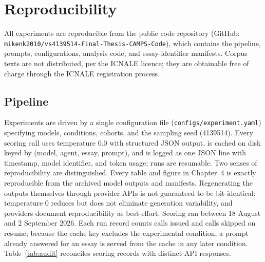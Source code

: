 \chapter{Reproducibility}
\label{chap:appendix-repro}

All experiments are reproducible from the public code repository
(GitHub: \texttt{mikenk2010/}\allowbreak\texttt{vs4139514-Final-Thesis-CAMPS-Code}),
which contains the pipeline, prompts, configurations, analysis code,
and essay-identifier manifests. Corpus texts are not distributed, per
the ICNALE licence; they are obtainable free of charge through the
ICNALE registration process.

\section*{Pipeline}
Experiments are driven by a single configuration file
(\texttt{configs/experiment.yaml}) specifying models, conditions,
cohorts, and the sampling seed (4139514). Every scoring call uses
temperature $0.0$ with structured JSON output, is cached on disk keyed
by (model, agent, essay, prompt), and is logged as one JSON line with
timestamp, model identifier, and token usage; runs are resumable.
Two senses of reproducibility are distinguished. Every table and
figure in Chapter~4 is exactly reproducible from the archived model
outputs and manifests. Regenerating the outputs themselves through
provider APIs is not guaranteed to be bit-identical: temperature 0
reduces but does not eliminate generation variability, and providers
document reproducibility as best-effort. Scoring ran between 18
August and 2 September 2026. Each run record counts calls issued and
calls skipped on resume; because the cache key excludes the
experimental condition, a prompt already answered for an essay is
served from the cache in any later condition. Table~\ref{tab:audit}
reconciles scoring records with distinct API responses.

